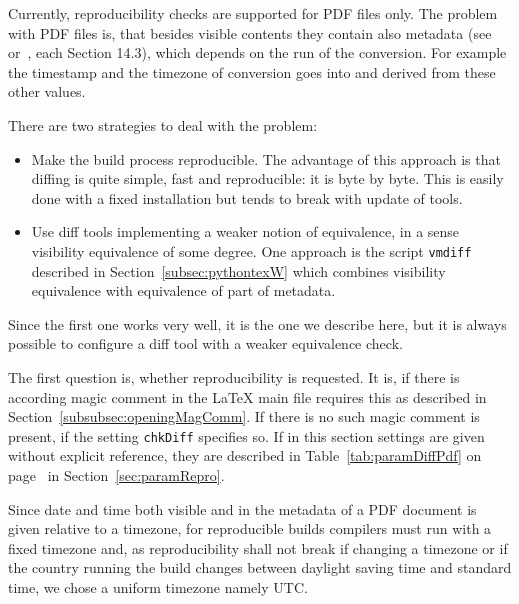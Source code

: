Currently, reproducibility checks are supported for PDF files only. 
The problem with PDF files is, that besides visible contents 
they contain also metadata (see~\cite{Pdf17} or~\cite{Pdf20}, each Section 14.3), 
which depends on the run of the conversion. 
For example the timestamp and the timezone of conversion goes into 
and derived from these other values. 

There are two strategies to deal with the problem: 
%
\begin{itemize}
  \item 
  Make the build process reproducible. 
  The advantage of this approach is that diffing is quite simple, 
  fast and reproducible: it is byte by byte. 
  This is easily done with a fixed installation 
  but tends to break with update of tools. 
  \item 
  Use diff tools implementing a weaker notion of equivalence, 
  in a sense visibility equivalence of some degree. 
  One approach is the script \texttt{vmdiff} 
  described in Section~\ref{subsec:pythontexW} 
  which combines visibility equivalence 
  with equivalence of part of metadata. 
\end{itemize}%

Since the first one works very well, it is the one we describe here, 
but it is always possible to configure a diff tool with a weaker equivalence check. 

The first question is, whether reproducibility is requested. 
It is, if there is according magic comment in the \LaTeX{} main file requires this 
as described in Section~\ref{subsubsec:openingMagComm}. 
If there is no such magic comment is present, if the setting \texttt{chkDiff} specifies so. 
If in this section settings are given without explicit reference, 
they are described in Table~\ref{tab:paramDiffPdf} on page~\pageref{tab:paramDiffPdf} 
in Section~\ref{sec:paramRepro}. 

Since date and time both visible and in the metadata of a PDF document 
is given relative to a timezone, 
for reproducible builds compilers must run with a fixed timezone 
and, as reproducibility shall not break if changing a timezone 
or if the country running the build changes between daylight saving time and standard time, 
we chose a uniform timezone namely UTC\@. 


